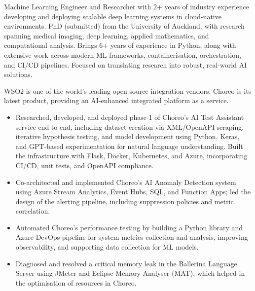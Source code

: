 \documentclass[12pt,a4paper,withhyper]{altacv}
\begin{document}


\makecvheader{}

\medskip


Machine Learning Engineer and Researcher with 2+ years of industry experience developing and deploying scalable deep learning systems in cloud-native environments. PhD (submitted) from the University of Auckland, with research spanning medical imaging, deep learning, applied mathematics, and computational analysis. Brings 6+ years of experience in Python, along with extensive work across modern ML frameworks, containerisation, orchestration, and CI/CD pipelines. Focused on translating research into robust, real-world AI solutions.

\medskip


WSO2 is one of the world's leading open-source integration vendors. Choreo is its latest product, providing an AI-enhanced integrated platform as a service.
\medskip
\begin{itemize} 
    \item Researched, developed, and deployed phase 1 of Choreo’s AI Test Assistant service end-to-end, including dataset creation via XML/OpenAPI scraping, iterative hypothesis testing, and model development using Python, Keras, and GPT-based experimentation for natural language understanding. Built the infrastructure with Flask, Docker, Kubernetes, and Azure, incorporating CI/CD, unit tests, and OpenAPI compliance.
    \item Co-architected and implemented Choreo’s AI Anomaly Detection system using Azure Stream Analytics, Event Hubs, SQL, and Function Apps; led the design of the alerting pipeline, including suppression policies and metric correlation.
    \item Automated Choreo’s performance testing by building a Python library and Azure DevOps pipeline for system metrics collection and analysis, improving observability, and supporting data collection for ML models.
    \item Diagnosed and resolved a critical memory leak in the Ballerina Language Server using JMeter and Eclipse Memory Analyser (MAT), which helped in the optimisation of resources in Choreo.
\end{itemize}
\end{document}
